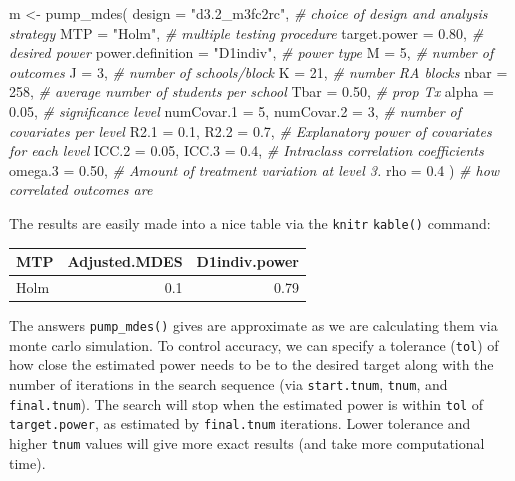 \documentclass[
]{article}
\newenvironment{Shaded}{\begin{snugshade}}{\end{snugshade}}
\newcommand{\AttributeTok}[1]{\textcolor[rgb]{0.77,0.63,0.00}{#1}}
\newcommand{\CommentTok}[1]{\textcolor[rgb]{0.56,0.35,0.01}{\textit{#1}}}
\newcommand{\DecValTok}[1]{\textcolor[rgb]{0.00,0.00,0.81}{#1}}
\newcommand{\FloatTok}[1]{\textcolor[rgb]{0.00,0.00,0.81}{#1}}
\newcommand{\FunctionTok}[1]{\textcolor[rgb]{0.00,0.00,0.00}{#1}}
\newcommand{\NormalTok}[1]{#1}
\newcommand{\OtherTok}[1]{\textcolor[rgb]{0.56,0.35,0.01}{#1}}
\newcommand{\StringTok}[1]{\textcolor[rgb]{0.31,0.60,0.02}{#1}}
\begin{document}
\begin{Shaded}
\begin{Highlighting}[]
\NormalTok{m }\OtherTok{\textless{}{-}} \FunctionTok{pump\_mdes}\NormalTok{(}
            \AttributeTok{design =} \StringTok{"d3.2\_m3fc2rc"}\NormalTok{, }\CommentTok{\# choice of design and analysis strategy}
            \AttributeTok{MTP =} \StringTok{"Holm"}\NormalTok{, }\CommentTok{\# multiple testing procedure}
            \AttributeTok{target.power =} \FloatTok{0.80}\NormalTok{, }\CommentTok{\# desired power}
            \AttributeTok{power.definition =} \StringTok{"D1indiv"}\NormalTok{, }\CommentTok{\# power type}
            \AttributeTok{M =} \DecValTok{5}\NormalTok{, }\CommentTok{\# number of outcomes}
            \AttributeTok{J =} \DecValTok{3}\NormalTok{, }\CommentTok{\# number of schools/block}
            \AttributeTok{K =} \DecValTok{21}\NormalTok{, }\CommentTok{\# number RA blocks}
            \AttributeTok{nbar =} \DecValTok{258}\NormalTok{, }\CommentTok{\# average number of students per school}
            \AttributeTok{Tbar =} \FloatTok{0.50}\NormalTok{, }\CommentTok{\# prop Tx}
            \AttributeTok{alpha =} \FloatTok{0.05}\NormalTok{, }\CommentTok{\# significance level}
            \AttributeTok{numCovar.1 =} \DecValTok{5}\NormalTok{, }\AttributeTok{numCovar.2 =} \DecValTok{3}\NormalTok{, }\CommentTok{\# number of covariates per level}
            \AttributeTok{R2.1 =} \FloatTok{0.1}\NormalTok{, }\AttributeTok{R2.2 =} \FloatTok{0.7}\NormalTok{, }\CommentTok{\# Explanatory power of covariates for each level}
            \AttributeTok{ICC.2 =} \FloatTok{0.05}\NormalTok{, }\AttributeTok{ICC.3 =} \FloatTok{0.4}\NormalTok{, }\CommentTok{\# Intraclass correlation coefficients}
            \AttributeTok{omega.3 =} \FloatTok{0.50}\NormalTok{, }\CommentTok{\# Amount of treatment variation at level 3.}
            \AttributeTok{rho =} \FloatTok{0.4}\NormalTok{ ) }\CommentTok{\# how correlated outcomes are}
\end{Highlighting}
\end{Shaded}

The results are easily made into a nice table via the \texttt{knitr}
\texttt{kable()} command:

\begin{tabular}{l|r|r}
\hline
MTP & Adjusted.MDES & D1indiv.power\\
\hline
Holm & 0.1 & 0.79\\
\hline
\end{tabular}

The answers \texttt{pump\_mdes()} gives are approximate as we are
calculating them via monte carlo simulation. To control accuracy, we can
specify a tolerance (\texttt{tol}) of how close the estimated power
needs to be to the desired target along with the number of iterations in
the search sequence (via \texttt{start.tnum}, \texttt{tnum}, and
\texttt{final.tnum}). The search will stop when the estimated power is
within \texttt{tol} of \texttt{target.power}, as estimated by
\texttt{final.tnum} iterations. Lower tolerance and higher \texttt{tnum}
values will give more exact results (and take more computational time).
\end{document}
